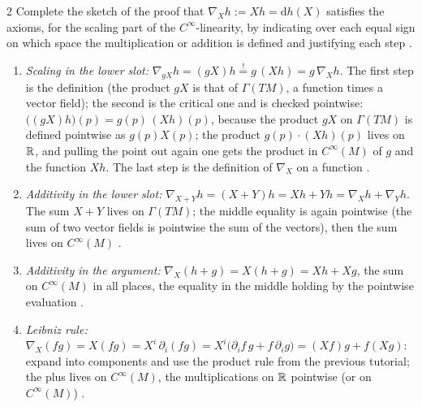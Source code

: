 \begin{paracol}{2}
Complete the sketch of the proof that $\nabla_Xh:=Xh=\mathrm dh(X)$ satisfies the axioms, for the scaling part of the $C^\infty$-linearity, by indicating over each equal sign on which space the multiplication or addition is defined and justifying each step .
\begin{enumerate}
  \item \emph{Scaling in the lower slot:} $\nabla_{gX}h=(gX)h\overset{!}{=}g\,(Xh)=g\,\nabla_Xh$. The first step is the definition (the product $gX$ is that of $\Gamma(TM)$, a function times a vector field); the second is the critical one and is checked pointwise: $\bigl((gX)h\bigr)(p)=g(p)\,(Xh)(p)$, because the product $gX$ on $\Gamma(TM)$ is defined pointwise as $g(p)X(p)$; the product $g(p)\cdot(Xh)(p)$ lives on $\mathbb{R}$, and pulling the point out again one gets the product in $C^\infty(M)$ of $g$ and the function $Xh$. The last step is the definition of $\nabla_X$ on a function .
  \item \emph{Additivity in the lower slot:} $\nabla_{X+Y}h=(X+Y)h=Xh+Yh=\nabla_Xh+\nabla_Yh$. The sum $X+Y$ lives on $\Gamma(TM)$; the middle equality is again pointwise (the sum of two vector fields is pointwise the sum of the vectors), then the sum lives on $C^\infty(M)$ .
  \item \emph{Additivity in the argument:} $\nabla_X(h+g)=X(h+g)=Xh+Xg$, the sum on $C^\infty(M)$ in all places, the equality in the middle holding by the pointwise evaluation .
  \item \emph{Leibniz rule:} $\nabla_X(fg)=X(fg)=X^i\,\partial_i(fg)=X^i\bigl(\partial_if\,g+f\,\partial_ig\bigr)=(Xf)g+f(Xg)$: expand into components and use the product rule from the previous tutorial; the plus lives on $C^\infty(M)$, the multiplications on $\mathbb{R}$ pointwise (or on $C^\infty(M)$) .
\end{enumerate}


\end{paracol}
